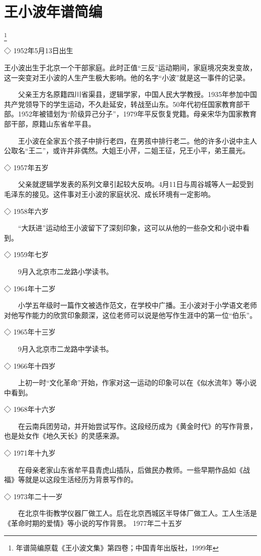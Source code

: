 \chapter*{王小波年谱简编}

\footnote{年谱简编原载《王小波文集》第四卷；中国青年出版社，1999年}

◇ 1952年5月13日出生

    王小波出生于北京一个干部家庭。此时正值“三反”运动期间，家庭境况突发变故，这一突变对王小波的人生产生极大影响。他的名字“小波”就是这一事件的记录。

　　父亲王方名原籍四川省渠县，逻辑学家，中国人民大学教授。1935年参加中国共产党领导下的学生运动，不久赴延安，转战至山东。50年代初任国家教育部干部。1952年被错划为“阶级异己分子”，1979年平反恢复党籍。母亲宋华为国家教育部干部，原籍山东省牟平县。

　　王小波在全家五个孩子中排行老四，在男孩中排行老二。他的许多小说中主人公取名“王二”，或许并非偶然。大姐王小芹，二姐王征，兄王小平，弟王晨光。

◇ 1957年五岁

　　父亲就逻辑学发表的系列文章引起较大反响。4月11日与周谷城等人一起受到毛泽东的接见。这件事对王小波的家庭状况、成长环境有一定影响。

◇ 1958年六岁

　　“大跃进”运动给王小波留下了深刻印象，这可以从他的一些杂文和小说中看到。

◇ 1959年七岁

　　9月入北京市二龙路小学读书。

◇ 1964年十二岁

　　小学五年级时一篇作文被选作范文，在学校中广播。王小波对于小学语文老师对他写作能力的欣赏印象颇深，这位老师可以说是他写作生涯中的第一位“伯乐”。

◇ 1965年十三岁

　　9月入北京市二龙路中学读书。

◇ 1966年十四岁

　　上初一时“文化革命”开始，作家对这一运动的印象可以在《似水流年》等小说中看到。

◇ 1968年十六岁

　　在云南兵团劳动，并开始尝试写作。这段经历成为《黄金时代》的写作背景，也是处女作《地久天长》的灵感来源。

◇ 1971年十九岁

　　在母亲老家山东省牟平县青虎山插队，后做民办教师。一些早期作品如《战福》等就是以这段生活经历为背景写作的。

◇ 1973年二十一岁

　　在北京牛街教学仪器厂做工人。后在北京西城区半导体厂做工人。工人生活是《革命时期的爱情》等小说的写作背景。 1977年二十五岁

